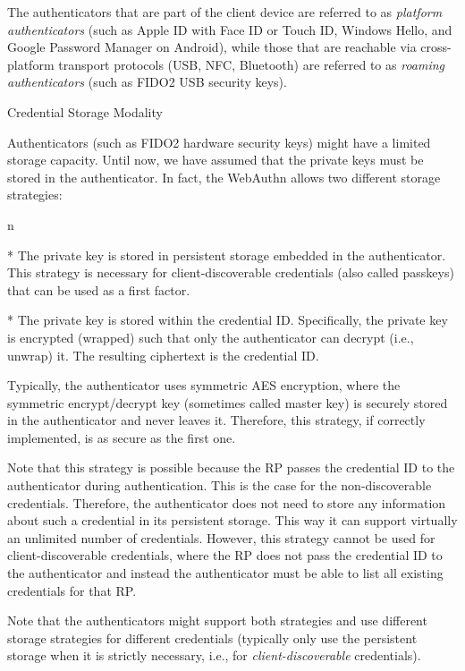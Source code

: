 The authenticators that are part of the client device are referred to as {\em platform authenticators} (such as Apple ID with Face ID or Touch ID, Windows Hello, and Google Password Manager on Android), while those that are reachable via cross-platform transport protocols (USB, NFC, Bluetooth) are referred to as {\em roaming authenticators} (such as {\sbf FIDO2 USB security keys}).


\secc Credential Storage Modality

Authenticators (such as FIDO2 hardware security keys) might have a limited storage capacity. Until now, we have assumed that {\sbf the private keys} must be stored in the authenticator. In fact, the WebAuthn allows {\sbf two different storage strategies}:

\begitems \style n

* The private key is stored {\sbf in persistent storage} embedded in the authenticator. This strategy is necessary for {\sbf client-discoverable credentials (also called passkeys)} that can be used as a first factor.

* The private key is {\sbf stored within the credential ID}. Specifically, the private key is encrypted {\sbf (wrapped)} such that only the authenticator can decrypt (i.e., unwrap) it. The resulting ciphertext is {\sbf the credential ID}.

Typically, the authenticator uses symmetric AES encryption, where the symmetric encrypt/decrypt key (sometimes called master key) is securely stored in the authenticator and never leaves it. Therefore, this strategy, if correctly implemented, is as secure as the first one.

Note that this strategy is possible because {\sbf the RP passes the credential ID} to the authenticator {\sbf during authentication}. This is the case for the non-discoverable credentials. Therefore, the authenticator does not need to store any information about such a credential in its persistent storage. This way it can support virtually an unlimited number of credentials. However, this strategy {\sbf cannot} be used for client-discoverable credentials, where the RP does {\sbf not} pass the credential ID to the authenticator and instead the authenticator must be able to list all existing credentials for that RP.

\enditems

Note that the authenticators {\sbf might support both strategies} and use different storage strategies for different credentials (typically only use the persistent storage when it is strictly necessary, i.e., for {\em client-discoverable} credentials).

